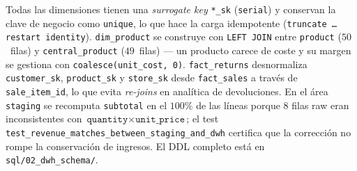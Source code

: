 Todas las dimensiones tienen una \emph{surrogate key} \texttt{*\_sk}
(\texttt{serial}) y conservan la clave de negocio como \texttt{unique},
lo que hace la carga idempotente (\texttt{truncate \dots restart
identity}). \texttt{dim\_product} se construye con \texttt{LEFT JOIN}
entre \texttt{product} ($50$~filas) y \texttt{central\_product}
($49$~filas) — un producto carece de coste y su margen se gestiona con
\texttt{coalesce(unit\_cost,\,0)}. \texttt{fact\_returns} desnormaliza
\texttt{customer\_sk}, \texttt{product\_sk} y \texttt{store\_sk} desde
\texttt{fact\_sales} a través de \texttt{sale\_item\_id}, lo que evita
\emph{re-joins} en analítica de devoluciones. En el área \texttt{staging}
se recomputa \texttt{subtotal} en el $100\%$ de las líneas porque $8$
filas raw eran inconsistentes con $\texttt{quantity}\times
\texttt{unit\_price}$; el test
\texttt{test\_revenue\_matches\_between\_staging\_and\_dwh} certifica
que la corrección no rompe la conservación de ingresos. El DDL completo
está en \texttt{sql/02\_dwh\_schema/}.
